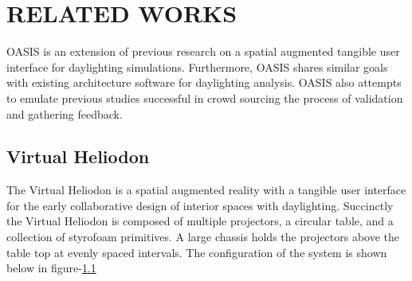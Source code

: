 \chapter{RELATED WORKS} \label{sec:introduction}
	OASIS is an extension of previous research on a spatial augmented tangible user interface for daylighting simulations\cite{barb,josh,yushan,everyone}.
	Furthermore, OASIS shares similar goals with existing architecture software for daylighting analysis.
	OASIS also attempts to emulate previous studies successful in crowd sourcing the process of validation and gathering feedback.

\section{Virtual Heliodon}
The Virtual Heliodon is a spatial augmented reality with a tangible user interface for the early collaborative design of interior spaces with daylighting\cite{barb, josh,yushang}. 
Succinctly the Virtual Heliodon is composed of multiple projectors, a circular table, and a collection of styrofoam primitives.  
A large chassis holds the projectors above the table top at evenly spaced intervals. The configuration of the system is shown below in figure-\ref{}




